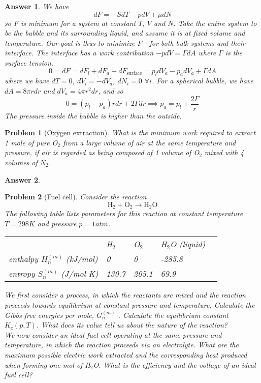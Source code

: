 \documentclass[a4paper]{article}
\newtheorem{ans}{Answer}[section]
\theoremstyle{new}
\newtheorem{qns}{Problem}[section]
\begin{document}
\begin{ans}
We have
$$dF=-SdT-pdV+\mu dN$$
so $F$ is minimum for a system at constant $T$, $V$ and $N$. Take the entire system to be the bubble and its surrounding liquid, and assume it is at fixed volume and temperature. Our goal is thus to minimize $F$ - for both bulk systems and their interface. The interface has a work contribution $-pdV=\Gamma dA$ where $\Gamma$ is the surface tension.
$$0=dF=dF_l+dF_a+dF_{\text{surface}}=p_ldV_a-p_adV_a+\Gamma dA$$
where we have $dT=0$, $dV_l=-dV_a$, $dN_i=0$ $\forall i$. For a spherical bubble, we have $dA=8\pi rdr$ and $dV_a=4\pi r^2dr$, and so
$$0=(p_l-p_a)rdr+2\Gamma dr\implies p_a=p_l+\frac{2\Gamma}{r}$$
The pressure inside the bubble is higher than the outside.
\end{ans}
\begin{qns}[Oxygen extraction]
What is the minimum work required to extract 1 mole of pure O$_2$ from a large volume of air at the same temperature and pressure, if air is regarded as being composed of 1 volume of O$_2$ mixed with 4 volumes of $N_2$. 
\end{qns}
\begin{ans}

\end{ans}
\newpage
\begin{qns}[Fuel cell]
Consider the reaction
$$\text{H}_2+\text{O}_2\rightarrow\text{H}_2\text{O}$$
The following table lists parameters for this reaction at constant temperature $T = 298 K$ and pressure $p = 1 atm$.
\begin{table}[H]
\begin{tabular}{lllll}
         & H$_2$    & O$_2$    & H$_2$O (liquid)    &  \\
enthalpy $H_n^{(m)}$ (kJ/mol) & 0     & 0     & -285.8 &  \\
entropy $S_n^{(m)}$ (J/mol K) & 130.7 & 205.1 & 69.9   & 
\end{tabular}
\end{table}
We first consider a process, in which the reactants are mixed and the reaction proceeds towards equilibrium at constant pressure and temperature. Calculate the Gibbs free energies per mole, $G_n^{(m)}$ . Calculate the equilibrium constant $K_c(p,T)$. What does its value tell us about the nature of the reaction?\\[5pt]
We now consider an ideal fuel cell operating at the same pressure and temperature, in which the reaction proceeds via an electrolyte. What are the maximum possible electric work extracted and the corresponding heat produced when forming one mol of H$_2$O. What is the efficiency and the voltage of an ideal fuel cell?
\end{qns}
\end{document}
